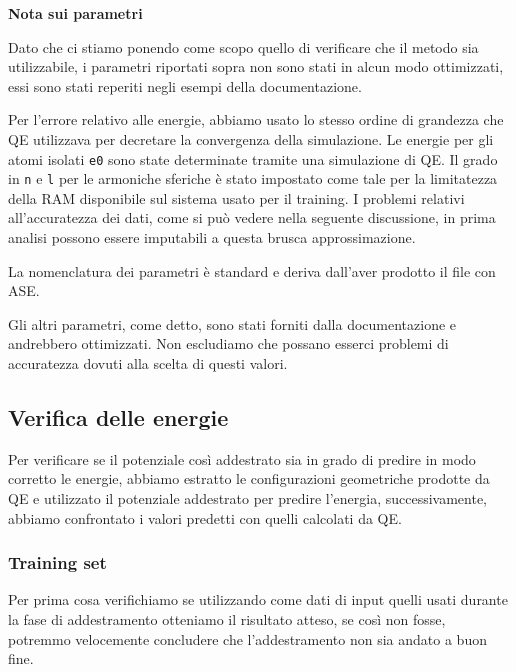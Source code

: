 \begin{tcolorbox}[
    center,
    fontupper=\footnotesize,
    colback=white,
    boxrule=0.8pt,
    colframe=gray!60,
    width=0.90\linewidth,
    arc=3mm
]
\textbf{Nota sui parametri}

Dato che ci stiamo ponendo come scopo quello di verificare che il metodo sia utilizzabile, i parametri riportati sopra non sono stati in alcun modo ottimizzati, essi sono stati reperiti negli esempi della documentazione. 
\end{tcolorbox}


Per l'errore relativo alle energie, abbiamo usato lo stesso ordine di grandezza che QE utilizzava per decretare la convergenza della simulazione.
Le energie per gli atomi isolati \texttt{e0} sono state determinate tramite una simulazione di QE.
Il grado in \texttt{n} e \texttt{l} per le armoniche sferiche è stato impostato come tale per la limitatezza della RAM disponibile sul sistema usato per il training. I problemi relativi all'accuratezza dei dati, come si può vedere nella seguente discussione, in prima analisi possono essere imputabili a questa brusca approssimazione.


La nomenclatura dei parametri è standard e deriva dall'aver prodotto il file con ASE.

Gli altri parametri, come detto, sono stati forniti dalla documentazione e andrebbero ottimizzati. Non escludiamo che possano esserci problemi di accuratezza dovuti alla scelta di questi valori.


\subsection{Verifica delle energie}

Per verificare se il potenziale così addestrato sia in grado di predire in modo corretto le energie, abbiamo estratto le configurazioni geometriche prodotte da QE e utilizzato il potenziale addestrato per predire l'energia, successivamente, abbiamo confrontato i valori predetti con quelli calcolati da QE.

\subsubsection{Training set}

Per prima cosa verifichiamo se utilizzando come dati di input quelli usati durante la fase di addestramento otteniamo il risultato atteso, se così non fosse, potremmo velocemente concludere che l'addestramento non sia andato a buon fine.

